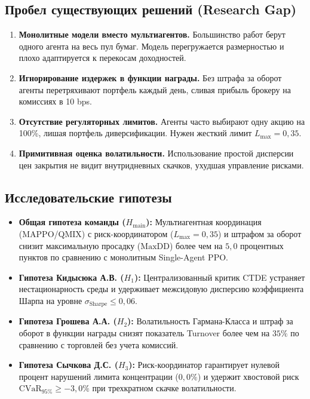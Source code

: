 \documentclass[11pt,a4paper]{article}
\begin{document}
\clearpage
\pdfpagewidth=210mm
\pdfpageheight=297mm
\restoregeometry

\subsection{Пробел существующих решений (Research Gap)}

\begin{enumerate}[leftmargin=*]
\item \textbf{Монолитные модели вместо мультиагентов.} Большинство работ берут одного агента на весь пул бумаг. Модель перегружается размерностью и плохо адаптируется к перекосам доходностей.
\item \textbf{Игнорирование издержек в функции награды.} Без штрафа за оборот агенты перетряхивают портфель каждый день, сливая прибыль брокеру на комиссиях в 10 bps.
\item \textbf{Отсутствие регуляторных лимитов.} Агенты часто выбирают одну акцию на 100\%, лишая портфель диверсификации. Нужен жесткий лимит $L_{\max} = 0{,}35$.
\item \textbf{Примитивная оценка волатильности.} Использование простой дисперсии цен закрытия не видит внутридневных скачков, ухудшая управление рисками.
\end{enumerate}

\subsection{Исследовательские гипотезы}

\begin{itemize}[leftmargin=*]
\item \textbf{Общая гипотеза команды ($H_{\text{main}}$):} Мультиагентная координация (MAPPO/QMIX) с риск-координатором ($L_{\max}=0{,}35$) и штрафом за оборот снизит максимальную просадку ($\text{MaxDD}$) более чем на $5{,}0$ процентных пунктов по сравнению с монолитным Single-Agent PPO.
\item \textbf{Гипотеза Кидысюка А.В. ($H_1$):} Централизованный критик CTDE устраняет нестационарность среды и удерживает межсидовую дисперсию коэффициента Шарпа на уровне $\sigma_{\text{Sharpe}} \le 0{,}06$.
\item \textbf{Гипотеза Грошева А.А. ($H_2$):} Волатильность Гармана-Класса и штраф за оборот в функции награды снизят показатель Turnover более чем на $35\%$ по сравнению с торговлей без учета комиссий.
\item \textbf{Гипотеза Сычкова Д.С. ($H_3$):} Риск-координатор гарантирует нулевой процент нарушений лимита концентрации ($0{,}0\%$) и удержит хвостовой риск $\text{CVaR}_{95\%} \ge -3{,}0\%$ при трехкратном скачке волатильности.
\end{itemize}
\end{document}
